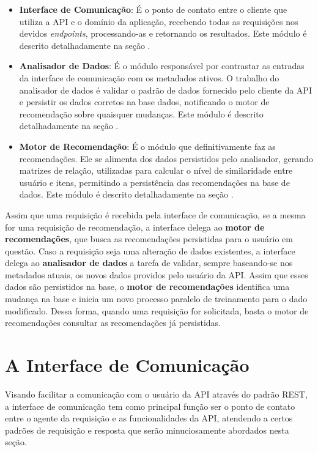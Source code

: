 \begin{itemize}
	\item \textbf{Interface de Comunicação}: É o ponto de contato entre o cliente que utiliza a API e o domínio da aplicação, recebendo todas as requisições nos devidos \textit{endpoints}, processando-as e retornando os resultados. Este módulo é descrito detalhadamente na seção .

	\item \textbf{Analisador de Dados}: É o módulo responsável por contrastar as entradas da interface de comunicação com os metadados ativos. O trabalho do analisador de dados é validar o padrão de dados fornecido pelo cliente da API e persistir os dados corretos na base dados, notificando o motor de recomendação sobre quaisquer mudanças. Este módulo é descrito detalhadamente na seção .

	\item \textbf{Motor de Recomendação}: É o módulo que definitivamente faz as recomendações. Ele se alimenta dos dados persistidos pelo analisador, gerando matrizes de relação, utilizadas para calcular o nível de similaridade entre usuário e itens, permitindo a persistência das recomendações na base de dados. Este módulo é descrito detalhadamente na seção .
\end{itemize}

Assim que uma requisição é recebida pela interface de comunicação, se a mesma for uma requisição de recomendação, a interface delega ao \textbf{motor de recomendações}, que busca as recomendações persistidas para o usuário em questão. Caso a requisição seja uma alteração de dados existentes, a interface delega ao \textbf{analisador de dados} a tarefa de validar, sempre baseando-se nos metadados atuais, os novos dados providos pelo usuário da API. Assim que esses dados são persistidos na base, o \textbf{motor de recomendações} identifica uma mudança na base e inicia um novo processo paralelo de treinamento para o dado modificado. Dessa forma, quando uma requisição for solicitada, basta o motor de recomendações consultar as recomendações já persistidas.

\section{A Interface de Comunicação} \label{interface}

Visando facilitar a comunicação com o usuário da API através do padrão REST, a interface de comunicação tem como principal função ser o ponto de contato entre o agente da requisição e as funcionalidades da API, atendendo a certos padrões de requisição e resposta que serão minuciosamente abordados nesta seção.

